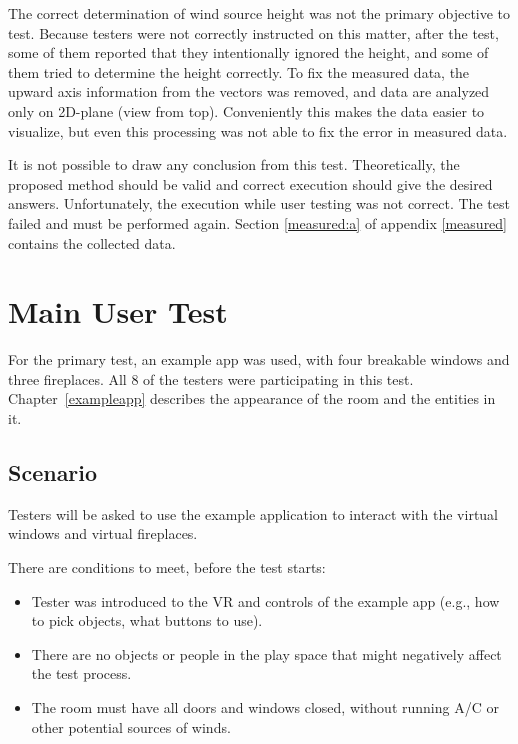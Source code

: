 The correct determination of wind source height was not the primary
objective to test. Because testers were not correctly instructed on this matter,
after the test, some of them reported that they intentionally ignored the
height, and some of them tried to determine the height correctly.
To fix the measured data, the upward axis information from the vectors was
removed, and data are analyzed only on 2D-plane (view from top).
Conveniently this makes the data easier to visualize, but even this
processing was not able to fix the error in measured data.

It is not possible to draw any conclusion from this test. Theoretically, the
proposed method should be valid and correct execution should give the
desired answers. Unfortunately, the execution while user testing was not
correct. The test failed and must be performed again. 
Section \ref{measured:a} of appendix \ref{measured} contains the collected data.


\hypertarget{x-main-user-test}{\section{Main User Test}}
For the primary test, an example app was used, with four breakable windows
and three fireplaces. All 8 of the testers were participating
in this test. Chapter~\ref{exampleapp} describes the appearance of the room 
and the entities in it.

\hypertarget{x-scenario}{\subsection{Scenario}}
Testers will be asked to use the example application to interact with 
the virtual windows and virtual fireplaces.

There are conditions to meet, before the test starts:

\begin{itemize}
    \itemsep0em

\item Tester was introduced to the VR and controls of
the example app (e.g., how to pick objects, what buttons to use).

\item There are no objects or people in the play space that might negatively affect
the test process.

\item The room must have all doors and windows closed, without running A/C
or other potential sources of winds.

\end{itemize}


